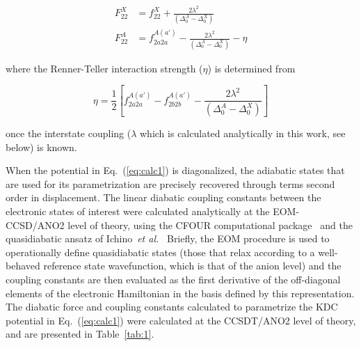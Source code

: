 \documentclass[aip,graphicx]{revtex4-1}
\begin{document}
\begin{align}
F_{22}^X &= f_{22}^X+\frac{2\lambda^2}{(\Delta_0^A-\Delta_0^X)}\\
F_{22}^A &= f_{2a2a}^{A(a')}-\frac{2\lambda^2}{(\Delta_0^A-\Delta_0^X)}-\eta
\label{eq:calc2}
\end{align}

where the Renner-Teller interaction strength ($\eta$) is determined from 

\begin{equation}
\eta = \frac{1}{2}\left[ f_{2a2a}^{A(a')}-f_{2b2b}^{A(a')}-\frac{2\lambda^2}{(\Delta_0^A-\Delta_0^X)}\right]
\label{eq:calc3}
\end{equation}

once the interstate coupling ($\lambda$ which is calculated analytically in this work, see below) is known.

When the potential in Eq.~(\ref{eq:calc1}) is diagonalized, the adiabatic states that are used for its parametrization are precisely recovered through terms second order in displacement. The linear diabatic coupling constants between the electronic states of interest were calculated analytically at the EOM-CCSD/ANO2 level of theory, using the CFOUR computational package~\cite{dev20} and the quasidiabatic ansatz of Ichino~\emph{et al.}~\cite{ich09} Briefly, the EOM procedure is used to operationally define quasidiabatic states (those that relax according to a well-behaved reference state wavefunction, which is that of the anion level) and the coupling constants are then evaluated as the first derivative of the off-diagonal elements of the electronic Hamiltonian in the basis defined by this representation. The diabatic force and coupling constants calculated to parametrize the KDC potential in Eq.~(\ref{eq:calc1}) were calculated at the CCSDT/ANO2 level of theory, and are presented in Table~\ref{tab:1}.
\end{document}
